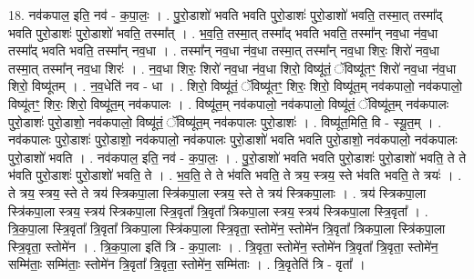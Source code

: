 \documentclass[17pt]{extarticle}
\begin{document}
18. नव॑कपाल॒ इति॒ नव॑ - क॒पा॒लः॒ । . पु॒रो॒डाशो॑ भवति भवति पुरो॒डाशः॑ पुरो॒डाशो॑ भवति॒ तस्मा॒त् तस्मा᳚द् भवति पुरो॒डाशः॑ पुरो॒डाशो॑ भवति॒ तस्मा᳚त् । . भ॒व॒ति॒ तस्मा॒त् तस्मा᳚द् भवति भवति॒ तस्मा᳚न् नव॒धा न॑व॒धा तस्मा᳚द् भवति भवति॒ तस्मा᳚न् नव॒धा । . तस्मा᳚न् नव॒धा न॑व॒धा तस्मा॒त् तस्मा᳚न् नव॒धा शिरः॒ शिरो॑ नव॒धा तस्मा॒त् तस्मा᳚न् नव॒धा शिरः॑ । . न॒व॒धा शिरः॒ शिरो॑ नव॒धा न॑व॒धा शिरो॒ विष्यू॑तं॒ ॅविष्यू॑तꣳ॒॒ शिरो॑ नव॒धा न॑व॒धा शिरो॒ विष्यू॑तम् । . न॒व॒धेति॑ नव - धा । . शिरो॒ विष्यू॑तं॒ ॅविष्यू॑तꣳ॒॒ शिरः॒ शिरो॒ विष्यू॑त॒म् नव॑कपालो॒ नव॑कपालो॒ विष्यू॑तꣳ॒॒ शिरः॒ शिरो॒ विष्यू॑त॒म् नव॑कपालः । . विष्यू॑त॒म् नव॑कपालो॒ नव॑कपालो॒ विष्यू॑तं॒ ॅविष्यू॑त॒म् नव॑कपालः पुरो॒डाशः॑ पुरो॒डाशो॒ नव॑कपालो॒ विष्यू॑तं॒ ॅविष्यू॑त॒म् नव॑कपालः पुरो॒डाशः॑ । . विष्यू॑त॒मिति॒ वि - स्यू॒त॒म् । . नव॑कपालः पुरो॒डाशः॑ पुरो॒डाशो॒ नव॑कपालो॒ नव॑कपालः पुरो॒डाशो॑ भवति भवति पुरो॒डाशो॒ नव॑कपालो॒ नव॑कपालः पुरो॒डाशो॑ भवति । . नव॑कपाल॒ इति॒ नव॑ - क॒पा॒लः॒ । . पु॒रो॒डाशो॑ भवति भवति पुरो॒डाशः॑ पुरो॒डाशो॑ भवति॒ ते ते भ॑वति पुरो॒डाशः॑ पुरो॒डाशो॑ भवति॒ ते । . भ॒व॒ति॒ ते ते भ॑वति भवति॒ ते त्रय॒ स्त्रय॒ स्ते भ॑वति भवति॒ ते त्रयः॑ । . ते त्रय॒ स्त्रय॒ स्ते ते त्रय॑ स्त्रिकपा॒ला स्त्रि॑कपा॒ला स्त्रय॒ स्ते ते त्रय॑ स्त्रिकपा॒लाः । . त्रय॑ स्त्रिकपा॒ला स्त्रि॑कपा॒ला स्त्रय॒ स्त्रय॑ स्त्रिकपा॒ला स्त्रि॒वृता᳚ त्रि॒वृता᳚ त्रिकपा॒ला स्त्रय॒ स्त्रय॑ स्त्रिकपा॒ला स्त्रि॒वृता᳚ । . त्रि॒क॒पा॒ला स्त्रि॒वृता᳚ त्रि॒वृता᳚ त्रिकपा॒ला स्त्रि॑कपा॒ला स्त्रि॒वृता॒ स्तोमे॑न॒ स्तोमे॑न त्रि॒वृता᳚ त्रिकपा॒ला स्त्रि॑कपा॒ला स्त्रि॒वृता॒ स्तोमे॑न । . त्रि॒क॒पा॒ला इति॑ त्रि - क॒पा॒लाः । . त्रि॒वृता॒ स्तोमे॑न॒ स्तोमे॑न त्रि॒वृता᳚ त्रि॒वृता॒ स्तोमे॑न॒ सम्मि॑ताः॒ सम्मि॑ताः॒ स्तोमे॑न त्रि॒वृता᳚ त्रि॒वृता॒ स्तोमे॑न॒ सम्मि॑ताः । . त्रि॒वृतेति॑ त्रि - वृता᳚ । \newline
\end{document}
